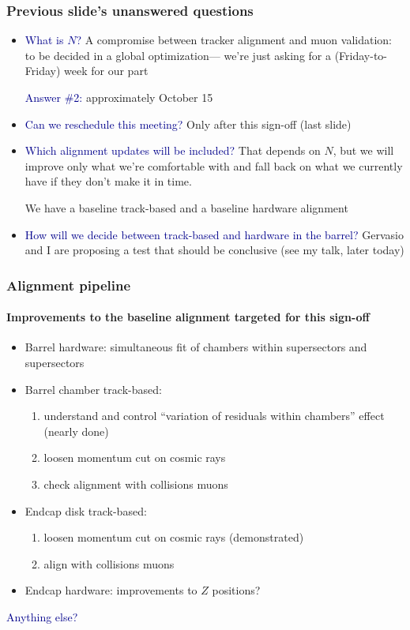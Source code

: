 \documentclass[compress]{beamer}
\begin{document}
\begin{frame}
\frametitle{Previous slide's unanswered questions}
\begin{itemize}\setlength{\itemsep}{0.3 cm}
\item \textcolor{darkblue}{What is $N$?}  A compromise between tracker alignment and muon
  validation: to be decided in a global optimization--- we're just
  asking for a (Friday-to-Friday) week for our part

\vspace{0.3 cm}
\textcolor{darkblue}{Answer \#2:} approximately October 15

\item \textcolor{darkblue}{Can we reschedule this meeting?}  Only after this sign-off (last slide)

\item \textcolor{darkblue}{Which alignment updates will be included?}  That depends on $N$,
  but we will improve only what we're comfortable with and fall back
  on what we currently have if they don't make it in time.

  We have a baseline track-based and a baseline hardware
  alignment

\item \textcolor{darkblue}{How will we decide between track-based and hardware in the
  barrel?}  Gervasio and I are proposing a test that should be
  conclusive (see my talk, later today)
\end{itemize}
\end{frame}

\begin{frame}
\frametitle{Alignment pipeline}
\framesubtitle{Improvements to the baseline alignment targeted for this sign-off}
\begin{itemize}\setlength{\itemsep}{0.3 cm}
\item Barrel hardware: simultaneous fit of chambers within supersectors and supersectors

\item Barrel chamber track-based:
\begin{enumerate}
\item understand and control ``variation of residuals within chambers'' effect (nearly done)
\item loosen momentum cut on cosmic rays
\item check alignment with collisions muons
\end{enumerate}

\item Endcap disk track-based:
\begin{enumerate}
\item loosen momentum cut on cosmic rays (demonstrated)
\item align with collisions muons
\end{enumerate}

\item Endcap hardware: improvements to $Z$ positions?
\end{itemize}

\textcolor{darkblue}{\large Anything else?}
\end{frame}
\end{document}
